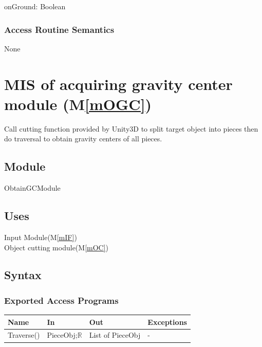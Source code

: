 \documentclass[12pt, titlepage]{article}
\newcommand{\mref}[1]{M\ref{#1}}
\begin{document}
onGround: Boolean 

\subsubsection{Access Routine Semantics}

None

\section{MIS of acquiring gravity center module (\mref{mOGC})} 

Call cutting function provided by Unity3D to split target object into pieces then do traversal to obtain gravity centers of all pieces. 

\subsection{Module}

ObtainGCModule

\subsection{Uses}

Input Module(\mref{mIF})\\
Object cutting module(\mref{mOC})\\

\subsection{Syntax}

\subsubsection{Exported Access Programs}

\begin{center}
	\begin{tabular}{p{2cm} p{4cm} p{4cm} p{2cm}}
		\hline
		\textbf{Name} & \textbf{In} & \textbf{Out} & \textbf{Exceptions} \\
		\hline
		Traverse() & PieceObj;$\mathbb{R}$ & List of PieceObj & -\\
		\hline
		
	\end{tabular}
\end{center}
\end{document}
